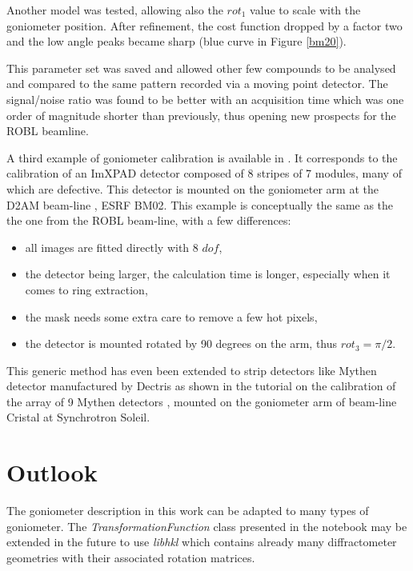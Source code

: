 \documentclass[preprint]{iucr}              %
\begin{document}
Another model was tested, allowing also the $rot_1$ value to scale with the 
goniometer position. 
After refinement, the cost function dropped by a factor two and
the low angle peaks became sharp (blue curve in Figure \ref{bm20}). 

This parameter set was saved and allowed other few compounds to be analysed and
compared to the same pattern recorded via a moving point detector. 
The signal/noise ratio was found to be better with an acquisition time which was one order
of magnitude shorter than previously, thus opening new prospects for
the ROBL beamline.

A third example of goniometer calibration is available in \cite{rotation_xpad}. 
It corresponds to the calibration of an ImXPAD detector \cite{BOUDET200341}
composed of 8 stripes of 7 modules, many of which are defective.
This detector is mounted on the goniometer arm at the D2AM beam-line
\cite{Ferrer:ri0008}, ESRF BM02. 
This example is conceptually the same as the the one from the ROBL beam-line,
with a few differences:
\begin{itemize}
  \item all images are fitted directly with 8 $dof$,
  \item the detector being larger, the calculation time is
        longer, especially when it comes to ring extraction,
  \item the mask needs some extra care to remove a few hot pixels,
  \item the detector is mounted rotated by 90 degrees on the arm, thus $rot_3=\pi/2$.
\end{itemize}

This generic method has even been extended to strip detectors 
like Mythen detector manufactured by Dectris as shown in the tutorial on the 
calibration of the array of 9 Mythen detectors \cite{rotation_mythen}, mounted on 
the goniometer arm of beam-line Cristal at Synchrotron Soleil.  

\section{Outlook}

The goniometer description in this work can be adapted to
many types of goniometer.
The \textit{TransformationFunction} class presented in the notebook may be extended
in the future to use \textit{libhkl} \cite{libhkl} which contains already many
diffractometer geometries with their associated rotation matrices. 
\end{document}
